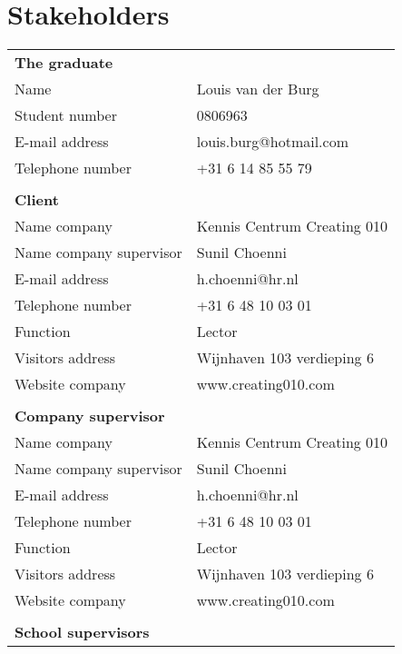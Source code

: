 \section{Stakeholders}

   \begin{tabular}
      { l l }
      \textbf{The graduate} & \\
      Name & Louis van der Burg \\
      Student number & 0806963 \\
      E-mail address & louis.burg@hotmail.com \\
      Telephone number & +31 6 14 85 55 79 \\
      & \\
      \textbf{Client} & \\
      Name company & Kennis Centrum Creating 010 \\
      Name company supervisor & Sunil Choenni \\
      E-mail address & h.choenni@hr.nl \\
      Telephone number & +31 6 48 10 03 01  \\
      Function & Lector \\
      Visitors address & Wijnhaven 103 verdieping 6 \\
      Website company & www.creating010.com \\
      & \\
      \textbf{Company supervisor} & \\
      Name company & Kennis Centrum Creating 010 \\
      Name company supervisor & Sunil Choenni \\
      E-mail address & h.choenni@hr.nl \\
      Telephone number & +31 6 48 10 03 01  \\
      Function & Lector \\
      Visitors address & Wijnhaven 103 verdieping 6 \\
      Website company & www.creating010.com \\
      & \\
      \textbf{School supervisors} & \\

\end{tabular}
